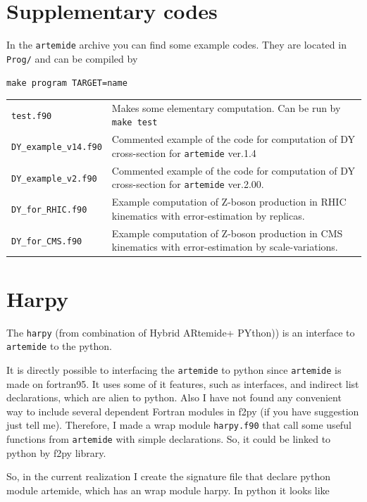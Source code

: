 \documentclass[prd,nofootinbib,eqsecnum,final]{revtex4}
\renewcommand{\(}{\left(}
\renewcommand{\)}{\right)}
\renewcommand{\[}{\left[}
\renewcommand{\]}{\right]}
\newcommand{\blue}[1]{{\color{blue} #1}}
\begin{document}
\newpage

\section{Supplementary codes}

In the \texttt{artemide} archive you can find some example codes. They are located in \texttt{Prog/} and can be compiled by

\texttt{make program TARGET=name}

\begin{tabular}{p{4cm} p{12cm}}
\texttt{test.f90} & Makes some elementary computation. Can be run by \texttt{make test}
\\
\texttt{DY\_example\_v14.f90} & Commented example of the code for computation of DY cross-section for \texttt{artemide} ver.1.4
\\
\texttt{DY\_example\_v2.f90} & Commented example of the code for computation of DY cross-section for \texttt{artemide} ver.2.00.
\\
\texttt{DY\_for\_RHIC.f90} & Example computation of Z-boson production in RHIC kinematics with error-estimation by replicas.
\\
\texttt{DY\_for\_CMS.f90} & Example computation of Z-boson production in CMS kinematics with error-estimation by scale-variations.
\end{tabular}



\newpage

\section{Harpy}

The \texttt{harpy} (from combination of \blue{H}ybrid \blue{AR}temide+\blue{PY}thon)) is an interface to \texttt{artemide} to the python.

It is directly possible to interfacing the \texttt{artemide} to python since \texttt{artemide} is made on fortran95. It uses some of it features, such as interfaces, and indirect list declarations, which are alien to python. Also I have not found any convenient way to include several dependent Fortran modules in f2py (if you have suggestion just tell me). Therefore, I made a wrap module \texttt{harpy.f90} that call some useful functions from \texttt{artemide} with simple declarations. So, it could be linked to python by f2py library.

So, in the current realization I create the signature file that declare python module artemide, which has an wrap module harpy. In python it looks like
\end{document}
